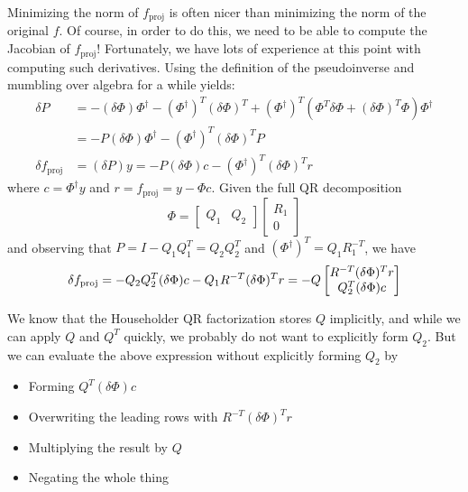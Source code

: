 \documentclass[12pt, leqno]{article} %
\providecommand{\tightlist}{%
  \setlength{\itemsep}{0pt}\setlength{\parskip}{0pt}}
\begin{document}
Minimizing the norm of \(f_{\mathrm{proj}}\) is often nicer than
minimizing the norm of the original \(f\). Of course, in order to do
this, we need to be able to compute the Jacobian of
\(f_{\mathrm{proj}}\)! Fortunately, we have lots of experience at this
point with computing such derivatives. Using the definition of the
pseudoinverse and mumbling over algebra for a while yields:
\begin{align*}
  \delta P &= 
  -(\delta \Phi) \Phi^\dagger - (\Phi^\dagger)^T (\delta \Phi)^T
  + (\Phi^\dagger)^T (\Phi^T \delta \Phi + (\delta \Phi)^T \Phi) \Phi^\dagger \\
  &= -P (\delta \Phi) \Phi^\dagger - (\Phi^\dagger)^T (\delta \Phi)^T P \\
  \delta f_{\mathrm{proj}} &= (\delta P) y 
  = -P (\delta \Phi) c - (\Phi^\dagger)^T (\delta \Phi)^T r
\end{align*} where \(c = \Phi^\dagger y\) and
\(r = f_{\mathrm{proj}} = y - \Phi c\). Given the full QR decomposition
\[\Phi = 
  \begin{bmatrix} Q_1 & Q_2 \end{bmatrix} 
  \begin{bmatrix} R_1 \\ 0 \end{bmatrix}\] and observing that
\(P = I-Q_1 Q_1^T = Q_2 Q_2^T\) and \((\Phi^\dagger)^T = Q_1 R_1^{-T}\),
we have \[\delta f_{\mathrm{proj}} 
  = -Q_2 Q_2^T (\delta \Phi) c - Q_1 R^{-T} (\delta \Phi)^T r \\
  = -Q 
  \begin{bmatrix} 
    R^{-T} (\delta \Phi)^T r \\ 
    Q_2^T (\delta \Phi) c 
  \end{bmatrix}\]

We know that the Householder QR factorization stores \(Q\) implicitly,
and while we can apply \(Q\) and \(Q^T\) quickly, we probably do not
want to explicitly form \(Q_2\). But we can evaluate the above
expression without explicitly forming \(Q_2\) by

\begin{itemize}
\tightlist
\item
  Forming \(Q^T (\delta \Phi) c\)
\item
  Overwriting the leading rows with \(R^{-T} (\delta \Phi)^T r\)
\item
  Multiplying the result by \(Q\)
\item
  Negating the whole thing
\end{itemize}
\end{document}
